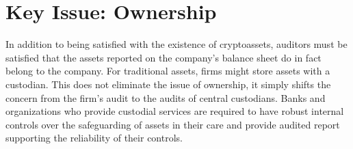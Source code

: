 
\section{Key Issue: Ownership}
In addition to being satisfied with the existence of cryptoassets, auditors must be satisfied that the assets reported on the company{'}s balance sheet do in fact belong to the company. For traditional assets, firms might store assets with a custodian. This does not eliminate the issue of ownership, it simply shifts the concern from the firm{'}s audit to the audits of central custodians. Banks and organizations who provide custodial services are required to have robust internal controls over the safeguarding of assets in their care and provide audited report supporting the reliability of their controls.

